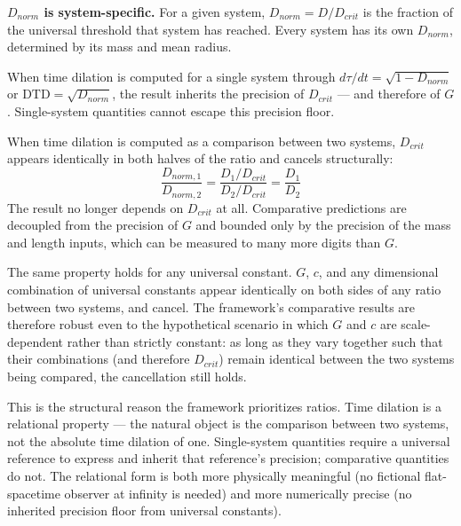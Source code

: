 \documentclass[twoside,twocolumn,9pt]{article}
\begin{document}
\textbf{$D_{norm}$ is system-specific.} For a given system, $D_{norm} = D/D_{crit}$ is the fraction of the universal threshold that system has reached. Every system has its own $D_{norm}$, determined by its mass and mean radius.

When time dilation is computed for a single system through $d\tau/dt = \sqrt{1 - D_{norm}}$ or $\text{DTD} = \sqrt{D_{norm}}$, the result inherits the precision of $D_{crit}$ — and therefore of $G$. Single-system quantities cannot escape this precision floor.

When time dilation is computed as a comparison between two systems, $D_{crit}$ appears identically in both halves of the ratio and cancels structurally:
\[
\frac{D_{norm,1}}{D_{norm,2}} = \frac{D_1/D_{crit}}{D_2/D_{crit}} = \frac{D_1}{D_2}
\]
The result no longer depends on $D_{crit}$ at all. Comparative predictions are decoupled from the precision of $G$ and bounded only by the precision of the mass and length inputs, which can be measured to many more digits than $G$.

The same property holds for any universal constant. $G$, $c$, and any dimensional combination of universal constants appear identically on both sides of any ratio between two systems, and cancel. The framework's comparative results are therefore robust even to the hypothetical scenario in which $G$ and $c$ are scale-dependent rather than strictly constant: as long as they vary together such that their combinations (and therefore $D_{crit}$) remain identical between the two systems being compared, the cancellation still holds.

This is the structural reason the framework prioritizes ratios. Time dilation is a relational property — the natural object is the comparison between two systems, not the absolute time dilation of one. Single-system quantities require a universal reference to express and inherit that reference's precision; comparative quantities do not. The relational form is both more physically meaningful (no fictional flat-spacetime observer at infinity is needed) and more numerically precise (no inherited precision floor from universal constants).
\end{document}
